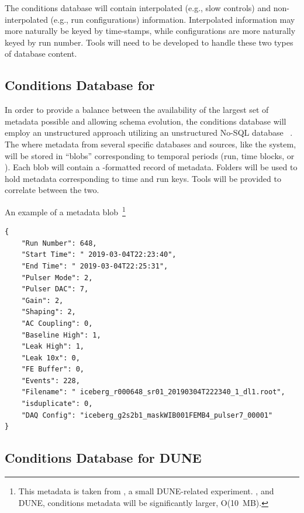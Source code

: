 \documentclass[../main-v1.tex]{subfiles}
\begin{document}
The conditions database will contain interpolated (e.g., slow controls) and non-interpolated (e.g., run configurations) information. Interpolated information may more naturally be keyed by time-stamps, while configurations are more naturally keyed by run number. Tools will need to be developed to handle these two %
types of database content. 

\subsection{Conditions Database for }

In order to provide a balance between the availability of the largest set of metadata possible  and allowing schema evolution,  the  conditions database will employ an unstructured approach utilizing an unstructured No-SQL database ~\cite{bib:ucondb}. The  where metadata from several specific databases and sources, like the  system, will be stored in ``blobs'' corresponding to temporal periods (run, time blocks, or ). Each blob will contain a -formatted record of metadata. Folders will be used to hold metadata corresponding to time and run keys. Tools will be provided to correlate between the two. 

An example of a metadata blob~\footnote{This metadata is taken from , a small DUNE-related experiment. , and DUNE, conditions metadata will be significantly larger, O(10~MB).}

\begin{verbatim}
{
    "Run Number": 648,
    "Start Time": " 2019-03-04T22:23:40",
    "End Time": " 2019-03-04T22:25:31",
    "Pulser Mode": 2,
    "Pulser DAC": 7,
    "Gain": 2,
    "Shaping": 2,
    "AC Coupling": 0,
    "Baseline High": 1,
    "Leak High": 1,
    "Leak 10x": 0,
    "FE Buffer": 0,
    "Events": 228,
    "Filename": " iceberg_r000648_sr01_20190304T222340_1_dl1.root",
    "isduplicate": 0,
    "DAQ Config": "iceberg_g2s2b1_maskWIB001FEMB4_pulser7_00001"
}
\end{verbatim}


\subsection{Conditions Database for DUNE}
\end{document}
